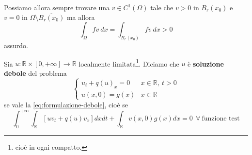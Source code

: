 \documentclass[10pt,a4paper,twoside,openright]{book}
\begin{document}
\begin{dimostrazione}
\begin{figure}[H]
\end{figure}
\FloatBarrier

Possiamo allora sempre trovare una $v\in C^{1}( \Omega )$ tale che $v >0$ in $B_{r}( x_{0})$ e $v=0$ in $\Omega \setminus \overline{B_{r}( x_{0})}$ ma allora
\begin{equation*}
	\int _{\Omega } fv\ dx=\int _{B_{r}( x_{0})} fv\ dx >0
\end{equation*}
assurdo.
\end{dimostrazione}
\begin{definition}
	 Sia $u:\mathbb{R} \times [ 0,+\infty ]\rightarrow \mathbb{R}$ localmente limitata\footnote{cioè in ogni compatto.}. Diciamo che $u$ è \textbf{soluzione debole} del problema
	\begin{equation*}
		\begin{cases}
			u_{t} +q( u)_{x} =0 & x\in \mathbb{R} ,\ t >0 \\
			u( x,0) =g( x)      & x\in \mathbb{R}         
		\end{cases}
	\end{equation*}
	se vale la \eqref{eq:formulazione-debole}, cioè se
	\begin{equation*}
		\int ^{+\infty }_{0}\int _{\mathbb{R}}[ uv_{t} +q( u) v_{x}] dxdt+\int _{\mathbb{R}} v( x,0) g( x) dx=0\ \ \forall \ \text{funzione test}
	\end{equation*}
\end{definition}
\end{document}

